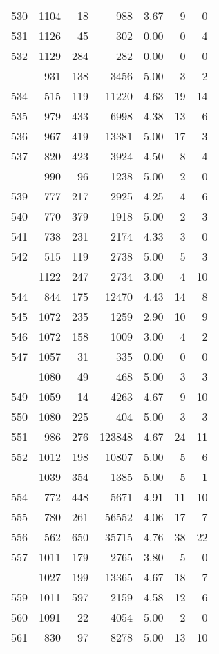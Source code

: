 \documentclass[
]{article}
\begin{document}
\begin{table}
\begin{tabular}[t]{lrrrrrr}
530 & 1104 & 18 & 988 & 3.67 & 9 & 0\\
531 & 1126 & 45 & 302 & 0.00 & 0 & 4\\
532 & 1129 & 284 & 282 & 0.00 & 0 & 0\\
\addlinespace
533 & 931 & 138 & 3456 & 5.00 & 3 & 2\\
534 & 515 & 119 & 11220 & 4.63 & 19 & 14\\
535 & 979 & 433 & 6998 & 4.38 & 13 & 6\\
536 & 967 & 419 & 13381 & 5.00 & 17 & 3\\
537 & 820 & 423 & 3924 & 4.50 & 8 & 4\\
\addlinespace
538 & 990 & 96 & 1238 & 5.00 & 2 & 0\\
539 & 777 & 217 & 2925 & 4.25 & 4 & 6\\
540 & 770 & 379 & 1918 & 5.00 & 2 & 3\\
541 & 738 & 231 & 2174 & 4.33 & 3 & 0\\
542 & 515 & 119 & 2738 & 5.00 & 5 & 3\\
\addlinespace
543 & 1122 & 247 & 2734 & 3.00 & 4 & 10\\
544 & 844 & 175 & 12470 & 4.43 & 14 & 8\\
545 & 1072 & 235 & 1259 & 2.90 & 10 & 9\\
546 & 1072 & 158 & 1009 & 3.00 & 4 & 2\\
547 & 1057 & 31 & 335 & 0.00 & 0 & 0\\
\addlinespace
548 & 1080 & 49 & 468 & 5.00 & 3 & 3\\
549 & 1059 & 14 & 4263 & 4.67 & 9 & 10\\
550 & 1080 & 225 & 404 & 5.00 & 3 & 3\\
551 & 986 & 276 & 123848 & 4.67 & 24 & 11\\
552 & 1012 & 198 & 10807 & 5.00 & 5 & 6\\
\addlinespace
553 & 1039 & 354 & 1385 & 5.00 & 5 & 1\\
554 & 772 & 448 & 5671 & 4.91 & 11 & 10\\
555 & 780 & 261 & 56552 & 4.06 & 17 & 7\\
556 & 562 & 650 & 35715 & 4.76 & 38 & 22\\
557 & 1011 & 179 & 2765 & 3.80 & 5 & 0\\
\addlinespace
558 & 1027 & 199 & 13365 & 4.67 & 18 & 7\\
559 & 1011 & 597 & 2159 & 4.58 & 12 & 6\\
560 & 1091 & 22 & 4054 & 5.00 & 2 & 0\\
561 & 830 & 97 & 8278 & 5.00 & 13 & 10\\

\end{tabular}
\end{table}
\end{document}
